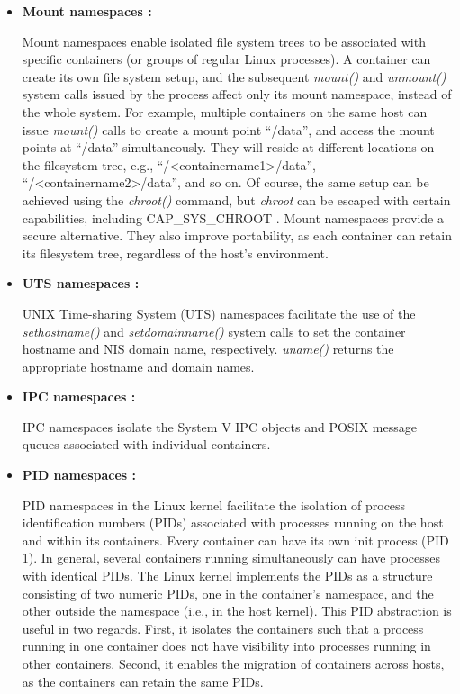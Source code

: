\begin{itemize}
\item \textbf{Mount namespaces :}

Mount namespaces enable isolated file system trees to be associated with specific containers (or groups of regular Linux processes). A container can create its own file system setup, and the subsequent \textit{mount()} and \textit{unmount()} system calls issued by the process affect only its mount namespace, instead of the whole system. For example, multiple containers on the same host can issue \textit{mount()} calls to create a mount point ``/data'', and access the mount points at ``/data'' simultaneously. They will reside at different locations on the filesystem tree, e.g., ``/\textless containername1\textgreater /data'', ``/\textless containername2\textgreater /data'', and so on. Of course, the same setup can be achieved using the \textit{chroot()} command, but \emph{chroot} can be escaped with certain capabilities, including CAP\_SYS\_CHROOT \cite{capabilities}. Mount namespaces provide a secure alternative. They also improve portability, as each container can retain its filesystem tree, regardless of the host's environment.


\item \textbf{UTS namespaces :}

UNIX Time-sharing System (UTS) namespaces facilitate the use of the \textit{sethostname()} and \textit{setdomainname()} system calls to set the container hostname and NIS domain name, respectively. \textit{uname()} returns the appropriate hostname and domain names.


\item \textbf{IPC namespaces :}

IPC namespaces isolate the System V IPC objects \cite{sysv_ipc} and POSIX message queues \cite{posix_msg_queues} associated with individual containers.


\item \textbf{PID namespaces :}

PID namespaces in the Linux kernel facilitate the isolation of process identification numbers (PIDs) associated with processes running on the host and within its containers. Every container can have its own init process (PID 1). In general, several containers running simultaneously can have processes with identical PIDs. The Linux kernel implements the PIDs as a structure consisting of two numeric PIDs, one in the container's namespace, and the other outside the namespace (i.e., in the host kernel). This PID abstraction is useful in two regards. First, it isolates the containers such that a process running in one container does not have visibility into processes running in other containers. Second, it enables the migration of containers across hosts, as the containers can retain the same PIDs.



\end{itemize}
